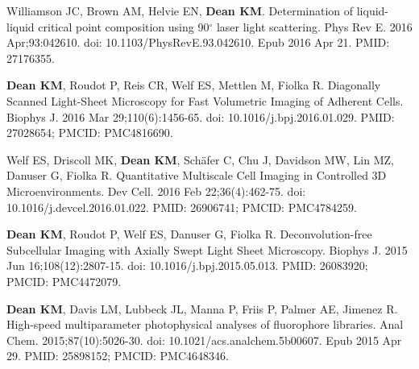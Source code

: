 \begin{etaremune}
\item Williamson JC, Brown AM, Helvie EN, \textbf{Dean KM}. Determination of liquid-liquid critical point composition using 90$^\circ$ laser light scattering. Phys Rev E. 2016 Apr;93:042610. doi: 10.1103/PhysRevE.93.042610. Epub 2016 Apr 21. PMID: 27176355.

\item \textbf{Dean KM}, Roudot P, Reis CR, Welf ES, Mettlen M, Fiolka R. Diagonally Scanned Light-Sheet Microscopy for Fast Volumetric Imaging of Adherent Cells. Biophys J. 2016 Mar 29;110(6):1456-65. doi: 10.1016/j.bpj.2016.01.029. PMID: 27028654; PMCID: PMC4816690.

\item Welf ES, Driscoll MK, \textbf{Dean KM}, Schäfer C, Chu J, Davidson MW, Lin MZ, Danuser G, Fiolka R. Quantitative Multiscale Cell Imaging in Controlled 3D Microenvironments. Dev Cell. 2016 Feb 22;36(4):462-75. doi: 10.1016/j.devcel.2016.01.022. PMID: 26906741; PMCID: PMC4784259.

\item \textbf{Dean KM}, Roudot P, Welf ES, Danuser G, Fiolka R. Deconvolution-free Subcellular Imaging with Axially Swept Light Sheet Microscopy. Biophys J. 2015 Jun 16;108(12):2807-15. doi: 10.1016/j.bpj.2015.05.013. PMID: 26083920; PMCID: PMC4472079.

\item \textbf{Dean KM}, Davis LM, Lubbeck JL, Manna P, Friis P, Palmer AE, Jimenez R. High-speed multiparameter photophysical analyses of fluorophore libraries. Anal Chem. 2015;87(10):5026-30. doi: 10.1021/acs.analchem.5b00607. Epub 2015 Apr 29. PMID: 25898152; PMCID: PMC4648346.


\end{etaremune}
